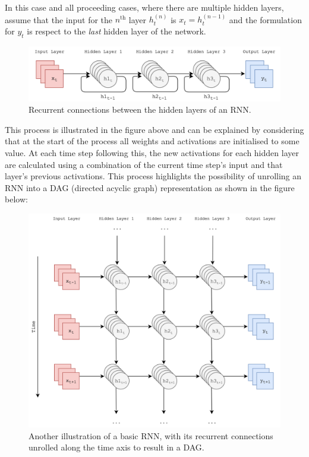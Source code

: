 \documentclass[12pt,]{article}
\begin{document}
In this case and all proceeding cases, where there are multiple hidden
layers, assume that the input for the \(n^{\text{th}}\) layer
\(h^{(n)}_t\) is \(x_t = h^{(n-1)}_t\) and the formulation for \(y_t\)
is respect to the \emph{last} hidden layer of the network.

\begin{figure}
\centering
\includegraphics{Images/rnn.png}
\caption{Recurrent connections between the hidden layers of an RNN.}
\end{figure}

This process is illustrated in the figure above and can be explained by
considering that at the start of the process all weights and activations
are initialised to some value. At each time step following this, the new
activations for each hidden layer are calculated using a combination of
the current time step's input and that layer's previous activations.
This process highlights the possibility of unrolling an RNN into a DAG
(directed acyclic graph) representation as shown in the figure below:

\begin{figure}
\centering
\includegraphics{Images/unrolledrnn.png}
\caption{Another illustration of a basic RNN, with its recurrent
connections unrolled along the time axis to result in a DAG.}
\end{figure}
\end{document}
